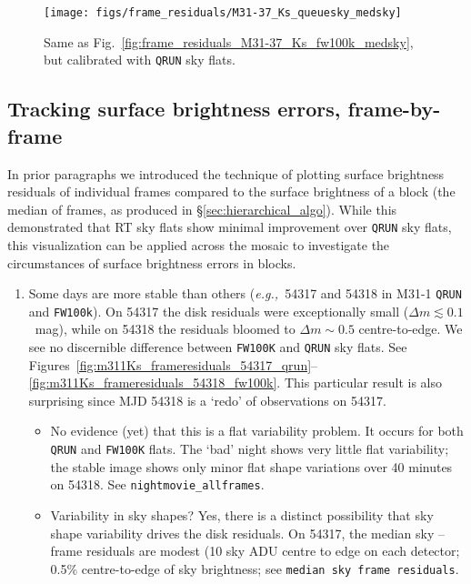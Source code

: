 \documentclass[iop]{emulateapj}
\newcommand{\eg}{\textit{e.g.,~}}
\newcommand{\Fig}[1]{Fig.~\ref{fig:#1}}  %
\newcommand{\Sec}[1]{\S\ref{sec:#1}}  %
\begin{document}
\begin{figure}[p]
\centering
\texttt{[image: figs/frame\_residuals/M31-37\_Ks\_queuesky\_medsky]}
\caption{Same as \Fig{frame_residuals_M31-37_Ks_fw100k_medsky}, but calibrated with \texttt{QRUN} sky flats.}
\label{fig:frame_residuals_M31-37_Ks_QRUN}
\end{figure}

\subsection{Tracking surface brightness errors, frame-by-frame}
\label{sec:diskframeresiduals}

In prior paragraphs we introduced the technique of plotting surface brightness residuals of individual frames compared to the surface brightness of a block (the median of frames, as produced in \Sec{hierarchical_algo}).
While this demonstrated that RT sky flats show minimal improvement over \texttt{QRUN} sky flats, this visualization can be applied across the mosaic to investigate the circumstances of surface brightness errors in blocks.
\begin{enumerate}
  \item Some days are more stable than others (\eg 54317 and 54318 in M31-1 \texttt{QRUN} and \texttt{FW100k}). On 54317 the disk residuals were exceptionally small ($\Delta m \lesssim 0.1$~mag), while on 54318 the residuals bloomed to $\Delta m \sim 0.5$ centre-to-edge. We see no discernible difference between \texttt{FW100K} and \texttt{QRUN} sky flats. See Figures~\ref{fig:m311Ks_frameresiduals_54317_qrun}--\ref{fig:m311Ks_frameresiduals_54318_fw100k}. This particular result is also surprising since MJD 54318 is a `redo' of observations on 54317.
    \begin{itemize}
      \item No evidence (yet) that this is a flat variability problem. It occurs for both \texttt{QRUN} and \texttt{FW100K} flats. The `bad' night shows very little flat variability; the stable image shows only minor flat shape variations over 40 minutes on 54318. See \texttt{nightmovie\_allframes}.
      \item Variability in sky shapes? Yes, there is a distinct possibility that sky shape variability drives the disk residuals. On 54317, the median sky -- frame residuals are modest (10 sky ADU centre to edge on each detector; 0.5\% centre-to-edge of sky brightness; see \texttt{median sky frame residuals}.
    \end{itemize}
\end{enumerate}
\end{document}
